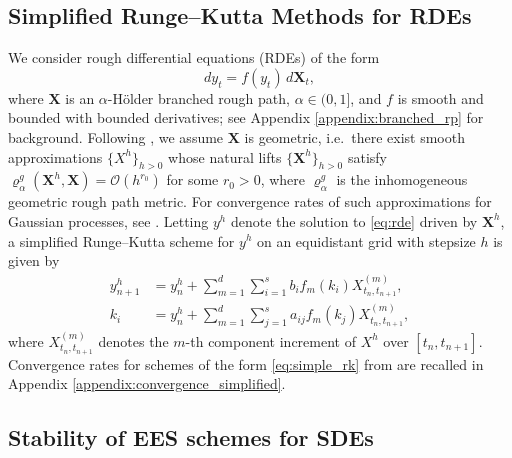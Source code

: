 \documentclass{article}
\theoremstyle{definition}
\theoremstyle{remark}
\begin{document}
\subsection{Simplified Runge--Kutta Methods for RDEs}
We consider rough differential equations (RDEs) of the form
\begin{equation}\label{eq:rde}
    dy_t = f(y_t)\, d\mathbf{X}_t,
\end{equation}
where $\mathbf{X}$ is an $\alpha$-H\"older branched rough path, $\alpha \in (0,1]$, 
and $f$ is smooth and bounded with bounded derivatives; see Appendix 
\ref{appendix:branched_rp} for background. Following \citet{redmann2022runge}, 
we assume $\mathbf{X}$ is geometric, i.e.\ there exist smooth approximations 
$\{X^h\}_{h>0}$ whose natural lifts $\{\mathbf{X}^h\}_{h>0}$ satisfy 
$\varrho_\alpha^g(\mathbf{X}^h, \mathbf{X}) = \mathcal{O}(h^{r_0})$ for some 
$r_0 > 0$, where $\varrho_\alpha^g$ is the inhomogeneous geometric rough path 
metric. For convergence rates of such approximations for Gaussian processes, 
see \cite{friz2014convergence}. Letting $y^h$ denote the solution to 
\eqref{eq:rde} driven by $\mathbf{X}^h$, a simplified Runge--Kutta scheme 
for $y^h$ on an equidistant grid with stepsize $h$ is given by
\begin{align}\label{eq:simple_rk}
    y^h_{n+1} &= y^h_n + \sum_{m=1}^d\sum_{i=1}^s b_i f_m(k_i) X^{(m)}_{t_n, t_{n+1}},\\
    k_i &= y^h_n + \sum_{m=1}^d\sum_{j=1}^s a_{ij} f_m(k_j) X^{(m)}_{t_n, t_{n+1}},\nonumber
\end{align}
where $X^{(m)}_{t_n,t_{n+1}}$ denotes the $m$-th component increment of $X^h$ 
over $[t_n, t_{n+1}]$. Convergence rates for schemes of the form 
\eqref{eq:simple_rk} from \citet{redmann2020runge} are recalled in Appendix 
\ref{appendix:convergence_simplified}.

\subsection{Stability of EES schemes for SDEs}
\end{document}
